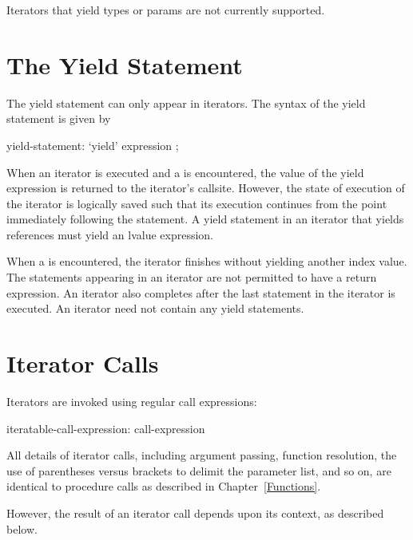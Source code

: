 \begin{openissue}
Iterators that yield types or params are not currently supported.
\end{openissue}

\section{The Yield Statement}
\label{The_Yield_Statement}

The yield statement can only appear in iterators.  The syntax of the
yield statement is given by
\begin{syntax}
yield-statement:
  `yield' expression ;
\end{syntax}

When an iterator is executed and a  is encountered, the
value of the yield expression is returned to the iterator's callsite.
However, the state of execution of the iterator is logically saved
such that its execution continues from the point immediately following
the  statement.  A yield statement in an iterator that
yields references must yield an lvalue expression.

When a  is encountered, the iterator finishes without yielding another
index value.  The  statements appearing in an iterator are not
permitted to have a return expression.
An iterator also completes after the last
statement in the iterator is executed.
An iterator need not contain any yield statements.


\section{Iterator Calls}
\label{Iterator_Calls}

Iterators are invoked using regular call expressions:
\begin{syntax}
iteratable-call-expression:
  call-expression
\end{syntax}

All details of iterator calls, including argument passing, function
resolution, the use of parentheses versus brackets to delimit the parameter
list, and so on,
are identical to procedure calls as described in Chapter~\ref{Functions}.

However, the result of an iterator call depends upon its context, as described below.

